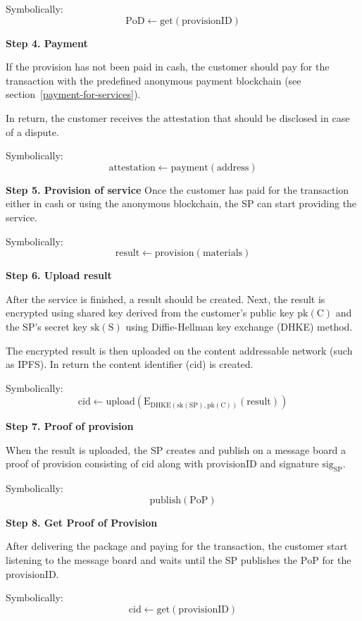 \documentclass{ieeeaccess}
\begin{document}
Symbolically: 
\[
\mathrm{PoD \gets get(provisionID)}
\]

\noindent \textbf
{Step 4. Payment}\label{step-4-payment}


If the provision has not been paid in cash, the customer should pay for the transaction with the predefined anonymous payment blockchain (see section~\ref{payment-for-services}).

In return, the customer receives the $\mathrm{attestation}$ that should be disclosed in case of a dispute.

Symbolically: 
\[
\mathrm{attestation \gets payment(address)}
\]

\noindent \textbf
{Step 5. Provision of service}\label{step-5-provision-of-service} 
Once the customer has paid for the transaction either in cash or using the anonymous blockchain, the SP can start providing the service.

Symbolically: 
\[
\mathrm{result \gets provision(materials)}
\]

\noindent \textbf
{Step 6. Upload result}\label{step-6-upload-result}

After the service is finished, a result should be created. 
Next, the result is encrypted using shared key derived from the customer's public key $\mathrm{pk(C)}$ and the SP's secret key $\mathrm{sk(S)}$ using Diffie-Hellman key exchange (DHKE) method.

The encrypted result is then uploaded on the content addressable network (such as IPFS). In return the content identifier ($\mathrm{cid}$) is created.

Symbolically: 
\[
\mathrm{cid \gets upload(E_{DHKE(sk(SP), pk(C))}(result))}
\]

\noindent \textbf
{Step 7. Proof of provision}\label{step-7-proof-of-provision}

When the $\mathrm{result}$ is uploaded, the SP creates and publish on a message board a proof of provision consisting of $\mathrm{cid}$ along with $\mathrm{provisionID}$ and signature $\mathrm{sig}_\mathrm{SP}$.

Symbolically: 
\[
\mathrm{publish(PoP)}
\]

\noindent \textbf
{Step 8. Get Proof of Provision}\label{step-8-get-proof-of-provision}

After delivering the package and paying for the transaction, the customer start listening to the message board and waits until the SP publishes the $\mathrm{PoP}$ for the $\mathrm{provisionID}$.

Symbolically: 
\[
\mathrm{cid \gets get(provisionID)}
\]
\end{document}
